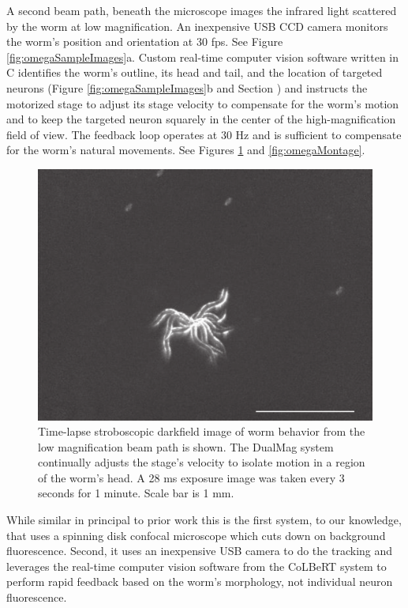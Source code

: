A second beam path, beneath the microscope images the infrared light scattered by the worm at low magnification. An inexpensive USB CCD camera monitors the worm's position and orientation at 30 fps. See Figure \ref{fig:omegaSampleImages}a. Custom real-time computer vision software written in C identifies the worm's outline, its head and tail,  and the location of targeted neurons (Figure \ref{fig:omegaSampleImages}b and Section \label{sec:omegaSoftware}) and instructs the motorized stage to adjust its stage velocity to compensate for the worm's motion and to keep the targeted neuron squarely in the center of the high-magnification field of view. The feedback loop operates at 30 Hz and is sufficient to compensate for the worm's natural movements. See Figures \ref{fig:omegaTimeLapse} and \ref{fig:omegaMontage}.


\begin{figure}  %
\includegraphics[width=\textwidth]{figures/omegaTimeLapse}
\caption[Time lapse image of behavior from low magnification beam path.]{Time-lapse stroboscopic darkfield image of worm behavior from the low magnification beam path is shown. The DualMag system continually adjusts the stage's velocity to isolate motion in a region of the worm's head. A 28 ms exposure image was taken every 3 seconds for 1 minute. Scale bar is 1 mm.
\label{fig:omegaTimeLapse}}
\end{figure}


While similar in principal to prior work \citep{ben_arous_automated_2010, piggott_neural_2011} this is the first system, to our knowledge, that uses a  spinning disk confocal microscope which cuts down on background fluorescence. Second, it uses an inexpensive USB camera to do the tracking and  leverages the real-time computer vision software from the CoLBeRT system \citep{leifer_optogenetic_2011} to perform rapid feedback based on the worm's morphology, not individual neuron fluorescence.





